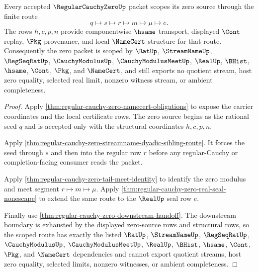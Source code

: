 \begin{theorem}
\label{thm:regular-cauchy-zero-scoped-route}
Every accepted $\RegularCauchyZeroUp$ packet scopes its zero source through the finite route
$$
q \mapsto s \mapsto r \mapsto m \mapsto \mu \mapsto e.
$$
The rows $h,c,p,n$ provide componentwise $\hsame$ transport, displayed $\Cont$ replay, $\Pkg$ provenance, and local $\NameCert$ structure for that route. Consequently the zero packet is scoped by $\RatUp$, $\StreamNameUp$, $\RegSeqRatUp$, $\CauchyModulusUp$, $\CauchyModulusMeetUp$, $\RealUp$, $\BHist$, $\hsame$, $\Cont$, $\Pkg$, and $\NameCert$, and still exports no quotient stream, host zero equality, selected real limit, nonzero witness stream, or ambient completeness.
\end{theorem}
\begin{proof}
Apply \autoref{thm:regular-cauchy-zero-namecert-obligations} to expose the carrier coordinates and the local certificate rows. The zero source begins as the rational seed $q$ and is accepted only with the structural coordinates $h,c,p,n$.

Apply \autoref{thm:regular-cauchy-zero-streamname-dyadic-sibling-route}. It forces the seed through $s$ and then into the regular row $r$ before any regular-Cauchy or completion-facing consumer reads the packet.

Apply \autoref{thm:regular-cauchy-zero-tail-meet-identity} to identify the zero modulus and meet segment $r \mapsto m \mapsto \mu$. Apply \autoref{thm:regular-cauchy-zero-real-seal-nonescape} to extend the same route to the $\RealUp$ seal row $e$.

Finally use \autoref{thm:regular-cauchy-zero-downstream-handoff}. The downstream boundary is exhausted by the displayed zero-source rows and structural rows, so the scoped route has exactly the listed $\RatUp$, $\StreamNameUp$, $\RegSeqRatUp$, $\CauchyModulusUp$, $\CauchyModulusMeetUp$, $\RealUp$, $\BHist$, $\hsame$, $\Cont$, $\Pkg$, and $\NameCert$ dependencies and cannot export quotient streams, host zero equality, selected limits, nonzero witnesses, or ambient completeness.
\end{proof}

